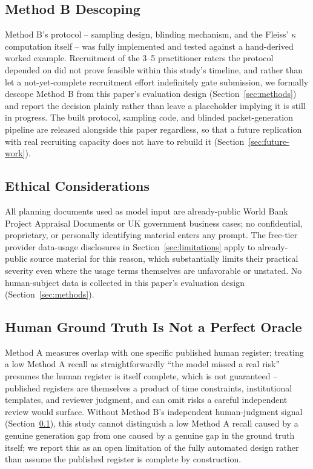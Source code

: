 \documentclass[conference]{IEEEtran}
\begin{document}
\subsection{Method B Descoping}
\label{sec:rater-status}
Method B's protocol -- sampling design, blinding mechanism, and the Fleiss'
$\kappa$ computation itself -- was fully implemented and tested against a
hand-derived worked example. Recruitment of the 3--5 practitioner raters
the protocol depended on did not prove feasible within this study's
timeline, and rather than let a not-yet-complete recruitment effort
indefinitely gate submission, we formally descope Method B from this
paper's evaluation design (Section~\ref{sec:methods}) and report the
decision plainly rather than leave a placeholder implying it is still in
progress. The built protocol, sampling code, and blinded packet-generation
pipeline are released alongside this paper regardless, so that a future
replication with real recruiting capacity does not have to rebuild it
(Section~\ref{sec:future-work}).

\subsection{Ethical Considerations}
All planning documents used as model input are already-public World Bank
Project Appraisal Documents or UK government business cases; no
confidential, proprietary, or personally identifying material enters any
prompt. The free-tier provider data-usage disclosures in
Section~\ref{sec:limitations} apply to already-public source material for
this reason, which substantially limits their practical severity even where
the usage terms themselves are unfavorable or unstated. No human-subject
data is collected in this paper's evaluation design (Section~\ref{sec:methods}).

\subsection{Human Ground Truth Is Not a Perfect Oracle}
Method A measures overlap with one specific published human register;
treating a low Method A recall as straightforwardly ``the model missed a
real risk'' presumes the human register is itself complete, which is not
guaranteed -- published registers are themselves a product of time
constraints, institutional templates, and reviewer judgment, and can omit
risks a careful independent review would surface. Without Method B's
independent human-judgment signal (Section~\ref{sec:rater-status}), this
study cannot distinguish a low Method A recall caused by a genuine
generation gap from one caused by a genuine gap in the ground truth
itself; we report this as an open limitation of the fully automated design
rather than assume the published register is complete by construction.
\end{document}
